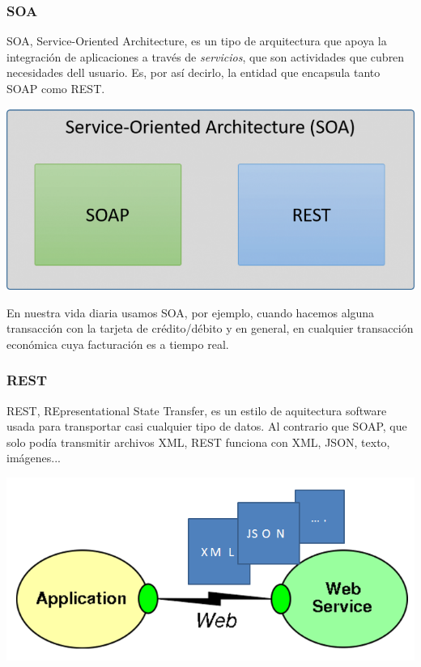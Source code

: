 \documentclass{article}
\begin{document}
\subsubsection{SOA}

SOA, Service-Oriented Architecture, es un tipo de arquitectura que apoya la integración de aplicaciones a través de \textit{servicios}, que son actividades que cubren necesidades dell usuario. Es, por así decirlo, la entidad que encapsula tanto SOAP como REST.

\begin{center}
\includegraphics[scale=0.3]{images/soa.png}
\end{center}

En nuestra vida diaria usamos SOA, por ejemplo, cuando hacemos alguna transacción con la tarjeta de crédito/débito y en general, en cualquier transacción económica cuya facturación es a tiempo real.

\subsubsection{REST}

REST, REpresentational State Transfer, es un estilo de aquitectura software usada para transportar casi cualquier tipo de datos. Al contrario que SOAP, que solo podía transmitir archivos XML, REST funciona con XML, JSON, texto, imágenes...

\begin{center}
\includegraphics[scale=0.3]{images/rest.png}
\end{center}
\end{document}
